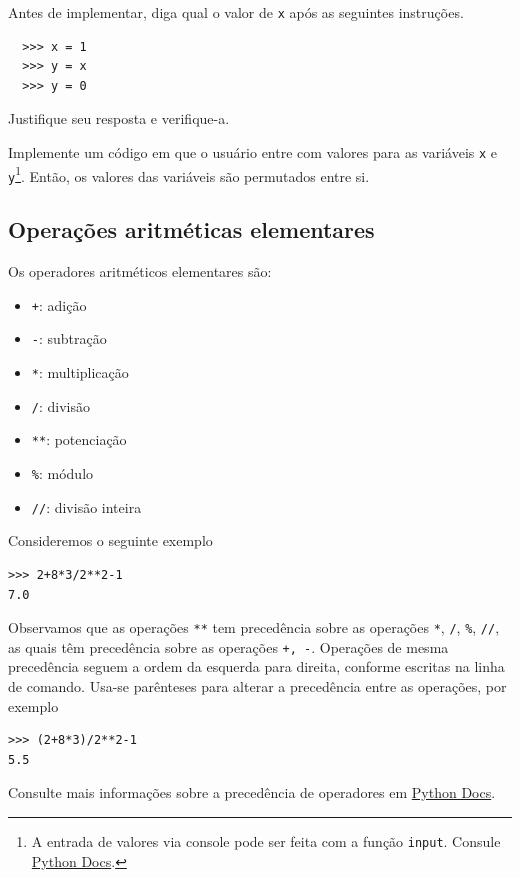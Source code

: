 \documentclass[12pt]{article}
\begin{document}
\begin{exr}
  Antes de implementar, diga qual o valor de \lstinline+x+ após as seguintes instruções.
  \begin{lstlisting}
  >>> x = 1
  >>> y = x
  >>> y = 0
  \end{lstlisting}
  Justifique seu resposta e verifique-a.
\end{exr}

\begin{exr}
  Implemente um código em que o usuário entre com valores para as variáveis \lstinline+x+ e \lstinline+y+\footnote{A entrada de valores via console pode ser feita com a função {\python} \lstinline+input+. Consule \href{https://docs.python.org/3/library/functions.html\#input}{Python Docs}.}. Então, os valores das variáveis são permutados entre si.
\end{exr}

\subsection{Operações aritméticas elementares}

Os operadores aritméticos elementares são:
\begin{itemize}
\item[]\lstinline-+-: adição
\item[]\lstinline+-+: subtração
\item[]\lstinline+*+: multiplicação
\item[]\lstinline+/+: divisão
\item[]\lstinline+**+: potenciação
\item[]\lstinline+%+: módulo
\item[]\lstinline+//+: divisão inteira
\end{itemize}

Consideremos o seguinte exemplo
\begin{lstlisting}
>>> 2+8*3/2**2-1
7.0
\end{lstlisting}
Observamos que as operações \lstinline+**+ tem precedência sobre as operações \lstinline+*+, \lstinline+/+, \lstinline+%+, %
\lstinline+//+, as quais têm precedência sobre as operações \lstinline!+, -!. Operações de mesma precedência seguem a ordem da esquerda para direita, conforme escritas na linha de comando. Usa-se parênteses para alterar a precedência entre as operações, por exemplo
\begin{lstlisting}
>>> (2+8*3)/2**2-1
5.5
\end{lstlisting}
Consulte mais informações sobre a precedência de operadores em \href{https://docs.python.org/3/reference/expressions.html#operator-precedence}{Python Docs}.
\end{document}
